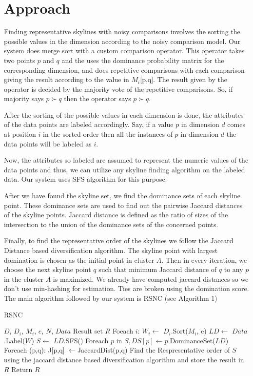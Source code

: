 \documentclass[twocolumn]{article}
\begin{document}
\section{Approach}
Finding representative skylines with noisy comparisons involves the sorting the possible values in the dimension according to the noisy comparison model. Our system does merge sort with a custom comparison operator. This operator takes two points $p$ and $q$ and the uses the dominance probability matrix for the corresponding dimension, and does repetitive comparisons with each comparison giving the result according to the value in $M_i$[p,q]. The result given by the operator is decided by the majority vote of the repetitive comparisons. So, if majority says $p \succ q$ then the operator says $p \succ q$. \cite{noisy}

After the sorting of the possible values in each dimension is done, the attributes of the data points are labeled accordingly. Say, if a value $p$ in dimension $d$ comes at position $i$ in the sorted order then all the instances of $p$ in dimension $d$ the data points will be labeled as $i$.

Now, the attributes so labeled are assumed to represent the numeric values of the data points and thus, we can utilize any skyline finding algorithm on the labeled data. Our system uses SFS algorithm for this purpose. \cite{skyline}

After we have found the skyline set, we find the dominance sets of each skyline point. These dominance sets are used to find out the pairwise Jaccard distances of the skyline points. Jaccard distance is defined as the ratio of sizes of the intersection to the union of the dominance sets of the concerned points. 

Finally, to find the representative order of the skylines we follow the Jaccard Distance based diversification algorithm. The skyline point with largest domination is chosen as the initial point in cluster $A$. Then in every iteration, we choose the next skyline point $q$ such that minimum Jaccard distance of $q$ to any $p$ in the cluster $A$ is maximized. We already have computed jaccard distances so we don't use min-hashing for estimation. Ties are broken using the domination score.
\cite{represent} \\

The main algorithm followed by our system is RSNC (see Algorithm 1)

\begin{algorithm}[t]
	\caption{RSNC}
	\label{alg:indexing}
	\begin{algorithmic}[1]
		\Require $D$, $D_i$, $M_i$, $e$, $N$, $Data$
		\Ensure Result set $R$
		\State Foeach $i$: $W_i \gets$ $D_i$.Sort($M_i$, e)
		\State $LD \gets$ $Data$.Label($W$)
		\State $S \gets$ $LD$.SFS()
		\State Foreach $p$ in $S, DS[p] \gets p$.DominanceSet($LD$)
		\State Foreach (p,q): J[p,q] $\gets $JaccardDist(p,q)
		\State Find the Respresentative order of $S$ using the jaccard distance based diversification algorithm and store the result in $R$
		\State Return $R$
	\end{algorithmic}
\end{algorithm}
\end{document}
